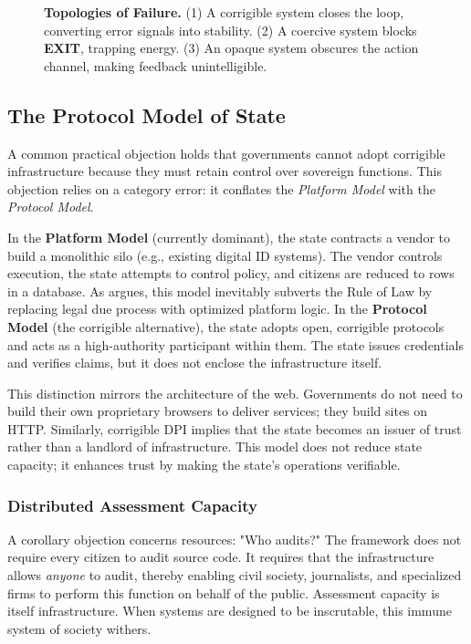 \documentclass{article}
\begin{document}
\begin{figure}[htbp]
\caption{\textbf{Topologies of Failure.}
(1) A corrigible system closes the loop, converting error signals into stability.
(2) A coercive system blocks \textbf{EXIT}, trapping energy.
(3) An opaque system obscures the action channel, making feedback unintelligible.}
\label{fig:failure_modes}
\end{figure}

\subsection{The Protocol Model of State}

A common practical objection holds that governments cannot adopt corrigible infrastructure because they must retain control over sovereign functions. This objection relies on a category error: it conflates the \textit{Platform Model} with the \textit{Protocol Model}.

In the \textbf{Platform Model} (currently dominant), the state contracts a vendor to build a monolithic silo (e.g., existing digital ID systems). The vendor controls execution, the state attempts to control policy, and citizens are reduced to rows in a database. As \citet{cohen2019} argues, this model inevitably subverts the Rule of Law by replacing legal due process with optimized platform logic. In the \textbf{Protocol Model} (the corrigible alternative), the state adopts open, corrigible protocols and acts as a high-authority participant within them. The state issues credentials and verifies claims, but it does not enclose the infrastructure itself.

This distinction mirrors the architecture of the web. Governments do not need to build their own proprietary browsers to deliver services; they build sites on HTTP. Similarly, corrigible DPI implies that the state becomes an issuer of trust rather than a landlord of infrastructure. This model does not reduce state capacity; it enhances trust by making the state's operations verifiable.

\subsubsection{Distributed Assessment Capacity}
A corollary objection concerns resources: "Who audits?" The framework does not require every citizen to audit source code. It requires that the infrastructure allows \textit{anyone} to audit, thereby enabling civil society, journalists, and specialized firms to perform this function on behalf of the public. Assessment capacity is itself infrastructure. When systems are designed to be inscrutable, this immune system of society withers.
\end{document}
